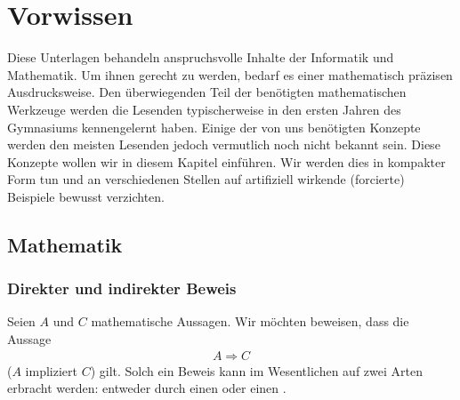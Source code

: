 \chapter{Vorwissen}\label{ch:Kapitel00}
Diese Unterlagen behandeln anspruchsvolle Inhalte der Informatik und Mathematik.
Um ihnen gerecht zu werden, bedarf es einer mathematisch präzisen Ausdrucksweise.
Den überwiegenden Teil der benötigten mathematischen Werkzeuge werden die Lesenden typischerweise in den ersten Jahren des Gymnasiums kennengelernt haben.
Einige der von uns benötigten Konzepte werden den meisten Lesenden jedoch vermutlich noch nicht bekannt sein.
Diese Konzepte wollen wir in diesem Kapitel einführen.
Wir werden dies in kompakter Form tun und an verschiedenen Stellen auf artifiziell wirkende (forcierte) Beispiele bewusst verzichten.

\section{Mathematik}
\subsection{Direkter und indirekter Beweis}
Seien $A$ und $C$ mathematische Aussagen. Wir möchten beweisen, dass die Aussage
\begin{align*}
	A\Rightarrow C
\end{align*}
($A$ impliziert $C$) gilt. Solch ein Beweis kann im Wesentlichen auf zwei Arten erbracht werden: entweder durch einen  oder einen .

